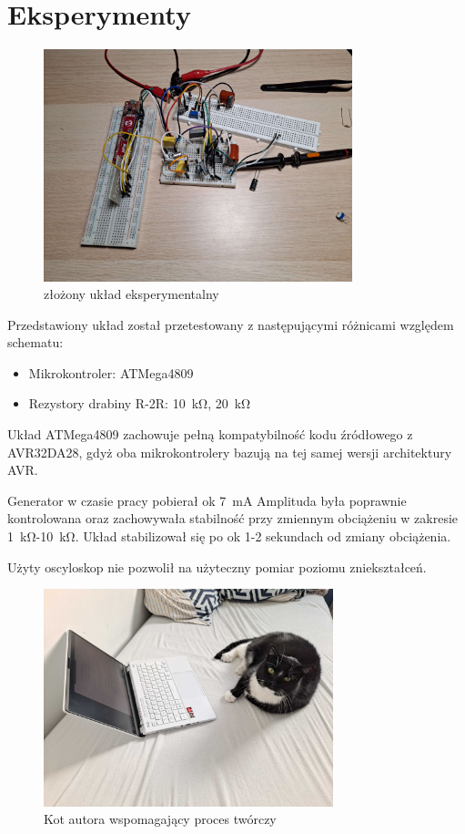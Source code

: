 \documentclass[12pt, a4paper]{article}
\begin{document}
\inputminted[linenos=true,escapeinside=@@,fontfamily=phv]{asm}{../code/src/main.S}

\section{Eksperymenty}
\begin{figure}[h]
	\centering
	\includegraphics[width=0.8\textwidth]{img/experimental_setup.jpg}
	\caption{złożony układ eksperymentalny}
	
\end{figure}

Przedstawiony układ został przetestowany z następującymi różnicami względem schematu:

\begin{itemize}
	\item Mikrokontroler: ATMega4809
	\item Rezystory drabiny R-2R: \qty{10}{\kohm}, \qty{20}{\kohm}
\end{itemize}

Układ ATMega4809 zachowuje pełną kompatybilność kodu źródłowego z AVR32DA28,
gdyż oba mikrokontrolery bazują na tej samej wersji architektury AVR.

Generator w czasie pracy pobierał ok \qty{7}{\mA} Amplituda była poprawnie
kontrolowana oraz zachowywała stabilność przy zmiennym obciążeniu w zakresie \qty{1}{\kohm}-\qty{10}{\kohm}.
Układ stabilizował się po ok 1-2 sekundach od zmiany obciążenia.

Użyty oscyloskop nie pozwolił na użyteczny pomiar poziomu zniekształceń. 

\newpage
\printbibliography[title=Źródła] %

\newpage

\begin{figure}
	\centering
	\includegraphics[width=0.75\textwidth]{img/kot_enter.jpg}
	\caption{Kot autora wspomagający proces twórczy}
\end{figure}
\end{document}
